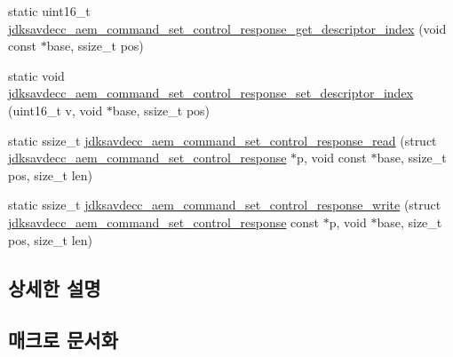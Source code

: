 \begin{DoxyCompactItemize}
\item 
static uint16\+\_\+t \hyperlink{group__command__set__control__response_ga5db3bc2b6aa4cca6e29f793b86381b8d}{jdksavdecc\+\_\+aem\+\_\+command\+\_\+set\+\_\+control\+\_\+response\+\_\+get\+\_\+descriptor\+\_\+index} (void const $\ast$base, ssize\+\_\+t pos)
\item 
static void \hyperlink{group__command__set__control__response_ga8ab1f8dc9d525ea61a1fe76eab4cdd0b}{jdksavdecc\+\_\+aem\+\_\+command\+\_\+set\+\_\+control\+\_\+response\+\_\+set\+\_\+descriptor\+\_\+index} (uint16\+\_\+t v, void $\ast$base, ssize\+\_\+t pos)
\item 
static ssize\+\_\+t \hyperlink{group__command__set__control__response_ga51e9c0e9f925de9340edeb0c66bb6b5a}{jdksavdecc\+\_\+aem\+\_\+command\+\_\+set\+\_\+control\+\_\+response\+\_\+read} (struct \hyperlink{structjdksavdecc__aem__command__set__control__response}{jdksavdecc\+\_\+aem\+\_\+command\+\_\+set\+\_\+control\+\_\+response} $\ast$p, void const $\ast$base, ssize\+\_\+t pos, size\+\_\+t len)
\item 
static ssize\+\_\+t \hyperlink{group__command__set__control__response_ga1baf427e932ebec21bb6bc41e2fb4d74}{jdksavdecc\+\_\+aem\+\_\+command\+\_\+set\+\_\+control\+\_\+response\+\_\+write} (struct \hyperlink{structjdksavdecc__aem__command__set__control__response}{jdksavdecc\+\_\+aem\+\_\+command\+\_\+set\+\_\+control\+\_\+response} const $\ast$p, void $\ast$base, size\+\_\+t pos, size\+\_\+t len)
\end{DoxyCompactItemize}


\subsection{상세한 설명}


\subsection{매크로 문서화}
